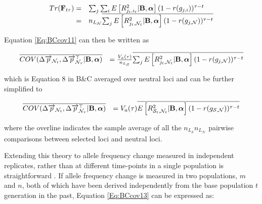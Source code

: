 \documentclass[12pt]{article}
\begin{document}
\begin{bibunit}
\begin{equation}
\begin{array}{rl}
Tr({\bf F}_{t\tau}) =& \sum_j\sum_i E\left[R_{j_t,i_t}^2 | {\bf B}, \boldsymbol{\alpha}\right](1-r(g_{j,i}))^{\tau-t}\\
=&n_{L_\mathcal{N}}\overline{\sum_jE\left[R_{j_t,{\mathcal N}_t}^2 | {\bf B}, \boldsymbol{\alpha}\right](1-r(g_{j,{\mathcal N}}))^{\tau-t}}\\
\end{array}
\end{equation}

Equation \ref{Eq:BCcov11} can then be written as

\begin{equation}
\begin{array}{rl}
\overline{COV(\Delta \overrightarrow{p}_{{\mathcal N}_t}, \Delta \overrightarrow{p}_{{\mathcal N}_{\tau}}^\top | {\bf B}, \boldsymbol{\alpha})}&=
\frac{V_a(\tau)}{n_{L_\mathcal{S}}}\overline{\sum_jE\left[R_{j_t,{\mathcal N}_t}^2 | {\bf B}, \boldsymbol{\alpha}\right](1-r(g_{j,{\mathcal N}}))^{\tau-t}}\\
\end{array}
\label{Eq:BCcov12}
\end{equation}

which is Equation 8 in B\&C averaged over neutral loci and can be further simplified to

\begin{equation}
\begin{array}{rl}
\overline{COV(\Delta \overrightarrow{p}_{{\mathcal N}_t}, \Delta \overrightarrow{p}_{{\mathcal N}_{\tau}}^\top | {\bf B}, \boldsymbol{\alpha})}&=
V_a(\tau)\overline{E\left[R_{{\mathcal S}_t,{\mathcal N}_t}^2 | {\bf B}, \boldsymbol{\alpha}\right](1-r(g_{{\mathcal S},{\mathcal N}}))^{\tau-t}}\\
\end{array}
\label{Eq:BCcov13}
\end{equation}

where the overline indicates the sample average of all the $n_{L_\mathcal{S}}n_{L_\mathcal{N}}$ pairwise comparisons between selected loci and neutral loci. 

Extending this theory to allele frequency change measured in independent replicates, rather than at different time-points in a single population is straightforward \citep{Buffalo.2020}. If allele frequency change is measured in two populations, $m$ and $n$,  both of which have been derived independently from the base population $t$ generation  in the past, Equation  \ref{Eq:BCcov13} can be expressed as:


\end{bibunit}
\end{document}
